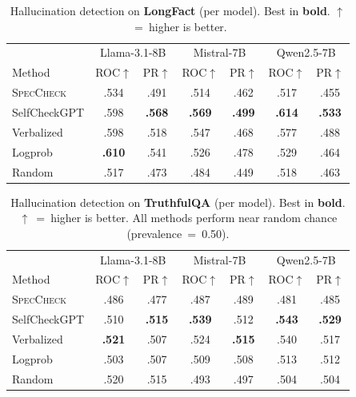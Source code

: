 \documentclass{article}
\newcommand{\speccheck}{\textsc{SpecCheck}}
\begin{document}
\begin{table}[t]
\centering
\caption{Hallucination detection on \textbf{LongFact} (per model). Best in \textbf{bold}. $\uparrow$~=~higher is better.}
\label{tab:main_longfact}
\begin{tabular}{lcccccc}
\toprule
& \multicolumn{2}{c}{Llama-3.1-8B} & \multicolumn{2}{c}{Mistral-7B} & \multicolumn{2}{c}{Qwen2.5-7B} \\
Method & ROC$\uparrow$ & PR$\uparrow$ & ROC$\uparrow$ & PR$\uparrow$ & ROC$\uparrow$ & PR$\uparrow$ \\
\midrule
\speccheck{} & .534 & .491 & .514 & .462 & .517 & .455 \\
SelfCheckGPT & .598 & \textbf{.568} & \textbf{.569} & \textbf{.499} & \textbf{.614} & \textbf{.533} \\
Verbalized & .598 & .518 & .547 & .468 & .577 & .488 \\
Logprob & \textbf{.610} & .541 & .526 & .478 & .529 & .464 \\
Random & .517 & .473 & .484 & .449 & .518 & .463 \\
\bottomrule
\end{tabular}
\end{table}

\begin{table}[t]
\centering
\caption{Hallucination detection on \textbf{TruthfulQA} (per model). Best in \textbf{bold}. $\uparrow$~=~higher is better. All methods perform near random chance (prevalence~=~0.50).}
\label{tab:main_truthfulqa}
\begin{tabular}{lcccccc}
\toprule
& \multicolumn{2}{c}{Llama-3.1-8B} & \multicolumn{2}{c}{Mistral-7B} & \multicolumn{2}{c}{Qwen2.5-7B} \\
Method & ROC$\uparrow$ & PR$\uparrow$ & ROC$\uparrow$ & PR$\uparrow$ & ROC$\uparrow$ & PR$\uparrow$ \\
\midrule
\speccheck{} & .486 & .477 & .487 & .489 & .481 & .485 \\
SelfCheckGPT & .510 & \textbf{.515} & \textbf{.539} & .512 & \textbf{.543} & \textbf{.529} \\
Verbalized & \textbf{.521} & .507 & .524 & \textbf{.515} & .540 & .517 \\
Logprob & .503 & .507 & .509 & .508 & .513 & .512 \\
Random & .520 & .515 & .493 & .497 & .504 & .504 \\
\bottomrule
\end{tabular}
\end{table}
\end{document}
